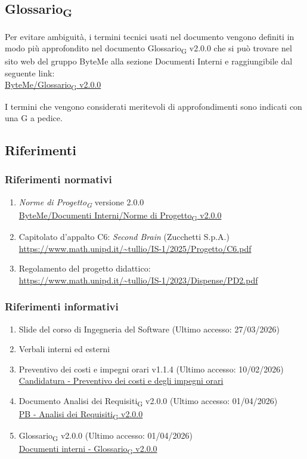 \documentclass[11pt,a4paper]{article}
\newcommand{\gls}[1]{#1\textsubscript{G}}
\begin{document}
\subsection{\gls{Glossario}}
Per evitare ambiguità, i termini tecnici usati nel documento vengono definiti in modo più approfondito nel documento \gls{Glossario} v2.0.0 che si può trovare nel sito web del gruppo ByteMe alla sezione Documenti Interni e raggiungibile dal seguente link:\\
\href{https://byteme25.github.io/ByteMe/files.html}{ByteMe/\gls{Glossario} v2.0.0}

I termini che vengono considerati meritevoli di approfondimenti sono indicati con una G a pedice.

\subsection{Riferimenti}
\subsubsection{Riferimenti normativi}
\begin{enumerate}
  \item \textit{\gls{Norme di Progetto}} versione 2.0.0\\
  \href{https://byteme25.github.io/ByteMe/files.html}{ByteMe/Documenti Interni/\gls{Norme di Progetto} v2.0.0}
  \item Capitolato d'appalto C6: \textit{Second Brain} (Zucchetti S.p.A.)\\ \url{https://www.math.unipd.it/~tullio/IS-1/2025/Progetto/C6.pdf}
  \item Regolamento del progetto didattico:\\
        \url{https://www.math.unipd.it/~tullio/IS-1/2023/Dispense/PD2.pdf}
\end{enumerate}

\subsubsection{Riferimenti informativi}
\begin{enumerate}
    \item Slide del corso di Ingegneria del Software (Ultimo accesso: 27/03/2026)
    \item Verbali interni ed esterni
    \item Preventivo dei costi e impegni orari v1.1.4 (Ultimo accesso: 10/02/2026)\\
    \href{https://byteme25.github.io/ByteMe/}{Candidatura - Preventivo dei costi e degli impegni orari}
    \item Documento \gls{Analisi dei Requisiti} v2.0.0 (Ultimo accesso: 01/04/2026)\\
    \href{https://byteme25.github.io/ByteMe/}{PB - \gls{Analisi dei Requisiti} v2.0.0}
    \item \gls{Glossario} v2.0.0 (Ultimo accesso: 01/04/2026)\\
    \href{https://byteme25.github.io/ByteMe/files.html}{Documenti interni - \gls{Glossario} v2.0.0}
\end{enumerate}
\end{document}
